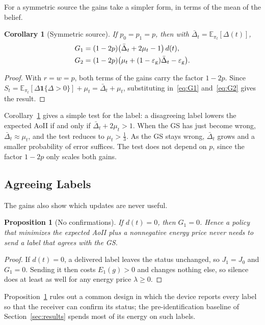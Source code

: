 \documentclass[5p,twocolumn]{elsarticle}
\newtheorem{proposition}{Proposition}
\newtheorem{corollary}{Corollary}
\theoremstyle{remark}
\newcommand{\E}{\mathbb{E}}
\newcommand{\ind}[1]{\mathbf{1}\{#1\}}
\newcommand{\Dbar}{\bar{\Delta}}
\newcommand{\ee}{\varepsilon}
\begin{document}
For a symmetric source the gains take a simpler form, in terms of the mean of the belief.

\begin{corollary}[Symmetric source]\label{cor:sym}
If $p_0=p_1=p$, then with $\Dbar_t=\E_{\pi_t}[\Delta(t)]$,
\begin{align*}
G_1&=(1-2p)\big(\Dbar_t+2\mu_t-1\big)\,d(t),\\
G_2&=(1-2p)\big(\mu_t+(1-\ee_{\rm g})\Dbar_t-\ee_{\rm g}\big).
\end{align*}
\end{corollary}
\begin{proof}
With $r=w=p$, both terms of the gains carry the factor $1-2p$. Since $S_t=\E_{\pi_t}[\Delta\ind{\Delta>0}]+\mu_t=\Dbar_t+\mu_t$, substituting in~\eqref{eq:G1} and~\eqref{eq:G2} gives the result.
\end{proof}

Corollary~\ref{cor:sym} gives a simple test for the label: a disagreeing label lowers the expected AoII if and only if $\Dbar_t+2\mu_t>1$. When the GS has just become wrong, $\Dbar_t\approx\mu_t$, and the test reduces to $\mu_t>\frac13$. As the GS stays wrong, $\Dbar_t$ grows and a smaller probability of error suffices. The test does not depend on $p$, since the factor $1-2p$ only scales both gains.

\subsection{Agreeing Labels}
The gains also show which updates are never useful.

\begin{proposition}[No confirmations]\label{prop:confirm}
If $d(t)=0$, then $G_1=0$. Hence a policy that minimizes the expected AoII plus a nonnegative energy price never needs to send a label that agrees with the GS.
\end{proposition}
\begin{proof}
If $d(t)=0$, a delivered label leaves the status unchanged, so $J_1=J_0$ and $G_1=0$. Sending it then costs $E_1(g)>0$ and changes nothing else, so silence does at least as well for any energy price $\lambda\ge0$.
\end{proof}

Proposition~\ref{prop:confirm} rules out a common design in which the device reports every label so that the receiver can confirm its status; the pre-identification baseline of Section~\ref{sec:results} spends most of its energy on such labels.
\end{document}
